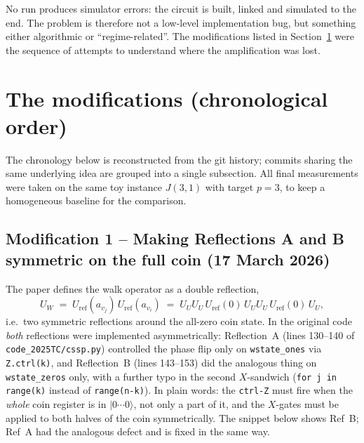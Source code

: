 \documentclass[11pt,a4paper]{article}
\begin{document}
No run produces simulator errors: the circuit is built, linked and
simulated to the end. The problem is therefore not a low-level
implementation bug, but something either algorithmic or ``regime-related''.
The modifications listed in Section~\ref{sec:mod} were the sequence of
attempts to understand where the amplification was lost.

\section{The modifications (chronological order)}
\label{sec:mod}

The chronology below is reconstructed from the git history;
commits sharing the same underlying idea are grouped into a single
subsection. All final measurements were taken on the same
toy instance $J(3,1)$ with target $p{=}3$, to keep a homogeneous
baseline for the comparison.


\subsection*{Modification 1 -- Making Reflections A and B symmetric
on the full coin (17 March 2026)}

The paper defines the walk operator as a double reflection,
\[
U_W \;=\; U_{\mathrm{ref}}(a_{v_j})\,U_{\mathrm{ref}}(a_{v_i})
\;=\; U_U U_U\,U_{\mathrm{ref}}(0)\,U_U U_U\,U_{\mathrm{ref}}(0)\,U_U,
\]
i.e.\ two symmetric reflections around the all-zero coin state. In the
original code \emph{both} reflections were implemented asymmetrically:
Reflection~A (lines 130--140 of \texttt{code\_2025TC/cssp.py})
controlled the phase flip only on \texttt{wstate\_ones} via
\texttt{Z.ctrl(k)}, and Reflection~B (lines 143--153) did the
analogous thing on \texttt{wstate\_zeros} only, with a further typo in
the second $X$-sandwich
(\texttt{for j in range(k)} instead of \texttt{range(n-k)}). In plain
words: the \texttt{ctrl-Z} must fire when the \emph{whole} coin
register is in $|0\cdots0\rangle$, not only a part of it, and the
$X$-gates must be applied to both halves of the coin symmetrically.
The snippet below shows Ref~B; Ref~A had the analogous defect and is
fixed in the same way.
\end{document}
